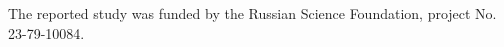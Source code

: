 



\vspace*{-12pt}

\Ack

\vspace*{-3pt}

\noindent 
The reported study was funded by the Russian Science Foundation, project No.\,23-79-10084. 
   


  \begin{multicols}{2}

\renewcommand{\bibname}{\protect\rmfamily References}


\end{multicols}
